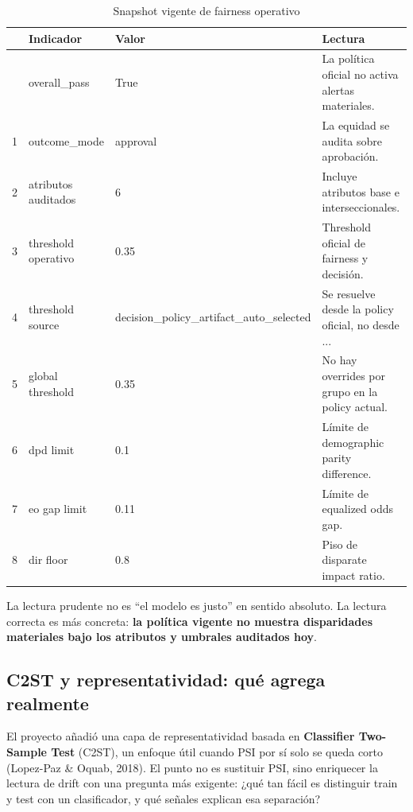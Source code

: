 \documentclass[
  spanish,
  11pt,
  letterpaper,
]{scrbook}
\theoremstyle{plain}
\theoremstyle{remark}
\begin{document}
{

\begin{longtable}[]{@{}llll@{}}

\caption{\label{tbl-mrm-fairness-current}Snapshot vigente de fairness
operativo}

\tabularnewline

\toprule\noalign{}
& Indicador & Valor & Lectura \\
\midrule\noalign{}
\endhead
\bottomrule\noalign{}
\endlastfoot
0 & overall\_pass & True & La política oficial no activa alertas
materiales. \\
1 & outcome\_mode & approval & La equidad se audita sobre aprobación. \\
2 & atributos auditados & 6 & Incluye atributos base e
interseccionales. \\
3 & threshold operativo & 0.35 & Threshold oficial de fairness y
decisión. \\
4 & threshold source & decision\_policy\_artifact\_auto\_selected & Se
resuelve desde la policy oficial, no desde ... \\
5 & global threshold & 0.35 & No hay overrides por grupo en la policy
actual. \\
6 & dpd limit & 0.1 & Límite de demographic parity difference. \\
7 & eo gap limit & 0.11 & Límite de equalized odds gap. \\
8 & dir floor & 0.8 & Piso de disparate impact ratio. \\

\end{longtable}

}

La lectura prudente no es ``el modelo es justo'' en sentido absoluto. La
lectura correcta es más concreta: \textbf{la política vigente no muestra
disparidades materiales bajo los atributos y umbrales auditados hoy}.

\subsection{C2ST y representatividad: qué agrega
realmente}\label{c2st-y-representatividad-quuxe9-agrega-realmente}

El proyecto añadió una capa de representatividad basada en
\textbf{Classifier Two-Sample Test} (C2ST), un enfoque útil cuando PSI
por sí solo se queda corto (Lopez-Paz \& Oquab, 2018). El punto no es
sustituir PSI, sino enriquecer la lectura de drift con una pregunta más
exigente: ¿qué tan fácil es distinguir train y test con un clasificador,
y qué señales explican esa separación?
\end{document}
